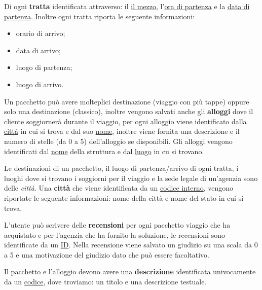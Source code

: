 Di ogni \textbf{tratta} identificata attraverso: il \underline{il mezzo}, l'\underline{ora di partenza} e la \underline{data di partenza}. Inoltre ogni tratta riporta le seguente informazioni:
\begin{multicols}{2}
    \begin{itemize}
        \item orario di arrivo;
        \item data di arrivo;
        \item luogo di partenza;
        \item luogo di arrivo.
    \end{itemize}
\end{multicols}

%
%
Un pacchetto può avere molteplici destinazione (viaggio con più tappe) oppure solo una destinazione (classico), inoltre vengono salvati anche gli \textbf{alloggi} dove il cliente soggiornerà durante il viaggio, per ogni alloggio viene identificato dalla \underline{città} in cui si trova e dal suo \underline{nome}, inoltre viene fornita una descrizione e il numero di stelle (da 0 a 5) dell'alloggio se disponibili. Gli alloggi vengono identificati dal \underline{nome} della struttura e dal \underline{luogo} in cu si trovano.

%
%
Le destinazioni di un pacchetto, il luogo di partenza/arrivo di ogni tratta, i luoghi dove si trovano i soggiorni per il viaggio e la sede legale di un'agenzia sono delle \emph{città}. Una \textbf{città} che viene identificata da un \underline{codice interno}, vengono riportate le seguente informazioni: nome della città e nome del stato in cui si trova.

%
%
L'utente può scrivere delle \textbf{recensioni} per ogni pacchetto viaggio che ha acquistato e per l'agenzia che ha fornito la soluzione, le recensioni sono identificate da un \underline{ID}. Nella recensione viene salvato un giudizio su una scala da 0 a 5 e una motivazione del giudizio dato che può essere facoltativo.

%
%
Il pacchetto e l'alloggio devono avere una \textbf{descrizione} identificata univocamente da un \underline{codice}, dove troviamo: un titolo e una descrizione testuale.
%

